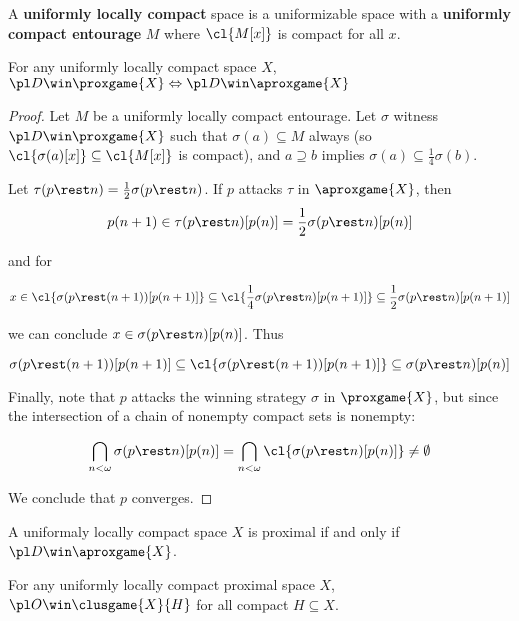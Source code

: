 \begin{defn}
  A \textbf{uniformly locally compact} space is a uniformizable space with a \textbf{uniformly compact entourage} $M$ where $\cl{M[x]}$ is compact for all $x$.
\end{defn}

\begin{thm}
  For any uniformly locally compact space $X$,
      $\pl D\win \proxgame{X} \Leftrightarrow \pl D\win \aproxgame{X}$
\end{thm}

\begin{proof}
  Let $M$ be a uniformly locally compact entourage. Let $\sigma$ witness $\pl D\win \proxgame{X}$ such that $\sigma(a)\subseteq M$ always (so $\cl{\sigma(a)[x]}\subseteq\cl{M[x]}$ is compact), and $a\supseteq b$  implies $\sigma(a)\subseteq\frac{1}{4}\sigma(b)$.

  Let $\tau(p\rest n)=\frac{1}{2}\sigma(p\rest n)$. If $p$ attacks $\tau$ in $\aproxgame{X}$, then
    \[
      p(n+1)
        \in
      \tau(p\rest n)[p(n)]
        =
      \frac{1}{2}\sigma(p\rest n)[p(n)]
    \]

    and for

    \[
      x
        \in
      \cl{\sigma(p\rest (n+1))[p(n+1)]}
        \subseteq
      \cl{\frac{1}{4}\sigma(p\rest n)[p(n+1)]}
        \subseteq
      \frac{1}{2}\sigma(p\rest n)[p(n+1)]
    \]

  we can conclude $x\in\sigma(p\rest n)[p(n)]$. Thus

    \[
      \sigma(p\rest (n+1))[p(n+1)]
        \subseteq
      \cl{\sigma(p\rest (n+1))[p(n+1)]}
        \subseteq
      \sigma(p\rest n)[p(n)]
    \]

  Finally, note that $p$ attacks the winning strategy $\sigma$ in $\proxgame{X}$, but since the intersection of a chain of nonempty compact sets is nonempty:

    \[
      \bigcap_{n<\omega} \sigma(p\rest n)[p(n)]
        =
      \bigcap_{n<\omega} \cl{\sigma(p\rest n)[p(n)]}
        \not=
      \emptyset
    \]

  We conclude that $p$ converges.
\end{proof}

\begin{cor}
  A uniformaly locally compact space $X$ is proximal if and only if $\pl D \win \aproxgame{X}$.
\end{cor}

\begin{thm}
  For any uniformly locally compact proximal space $X$, $\pl O\win \clusgame{X}{H}$ for all compact $H\subseteq X$.
\end{thm}

